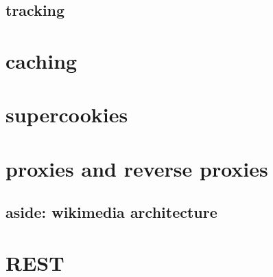 \subsection{tracking}


\section{caching}


\section{supercookies}


\section{proxies and reverse proxies}


\subsection{aside: wikimedia architecture}


\section{REST}


